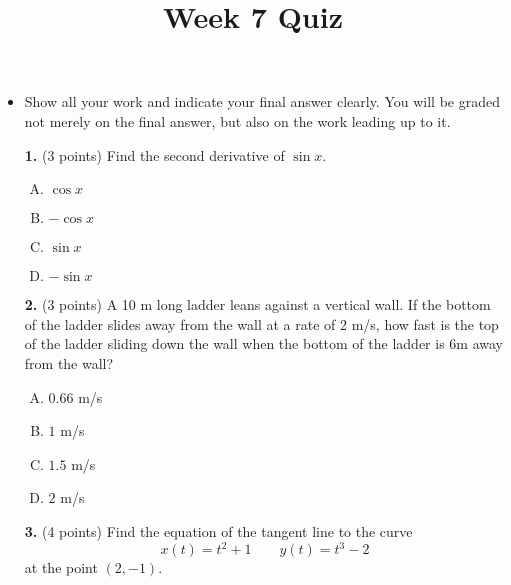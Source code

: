 \documentclass[12pt]{amsart}
\title{Week 7 Quiz}%
\begin{document}
\maketitle
\thispagestyle{fancy}

\begin{itemize}
\item Show all your work and indicate your final
answer clearly. You will be graded not merely on the final answer, but also on the work leading up to it.
\end{itemize}
\vskip0.25in
\begin{enumerate}


\item[\textbf{1. }] (3 points) Find the second derivative of $\sin x$.

\begin{multicols}{4}
\begin{enumerate}[A.]
    \item $\cos x$
    \item $-\cos x$
    \item $\sin x$
    \item $-\sin x$
\end{enumerate}
\end{multicols}

\vskip 1in


\item[\textbf{2. }] (3 points) A 10 m long ladder leans against a vertical wall. If the bottom of the ladder slides away from the wall at a rate of 2 m/s, how fast is the top of the ladder sliding down the wall when the bottom of the ladder is 6m away from the wall?

\begin{multicols}{4}
\begin{enumerate}[A.]
    \item $0.66$ m/s
    \item $1$ m/s
    \item $1.5$ m/s
    \item $2$ m/s
\end{enumerate}
\end{multicols}

\vskip 2in


\item[\textbf{3. }](4 points) Find the equation of the tangent line to the curve 
$$x(t) = t^2 + 1 \quad \quad y(t) = t^3 -2$$
at the point $(2, -1)$.
 





\end{enumerate}
\end{document}
